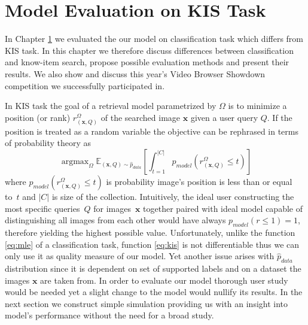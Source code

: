 \chapter{Model Evaluation on KIS Task}
In Chapter \ref{} we evaluated the our model on classification task which differs from KIS task. In this chapter we therefore discuss differences between classification and know-item search, propose possible evaluation methods and present their results. We also show and discuss this year's Video Browser Showdown competition we successfully participated in.

In KIS task the goal of a retrieval model parametrized by $\bm{\varOmega}$ is to minimize a position (or rank) $r_{(\bm{x},Q)}^{\bm{\varOmega}}$ of the searched image $\bm{x}$ given a user query $Q$. If the position is treated as a random variable the objective can be rephrased in terms of probability theory as
\begin{equation}
\mathop{\arg\max}_{\bm{\varOmega}}\mathbb{E}_{\left(\bm{x},Q\right)\sim \hat{p}_{data}}\left[
\int_{t=1}^{|C|}p_{model}\left(r_{(\bm{x},Q)}^{\bm{\varOmega}}\leq t\right)
\right]\label{eq:kis}
\end{equation}
where $p_{model}\left(r_{(\bm{x},Q)}^{\bm{\varOmega}}\leq t\right)$ is probability image's position is less than or equal to~$t$ and $|C|$ is size of the collection. Intuitively, the ideal user constructing the most specific queries~$Q$ for images~$\bm{x}$ together paired with ideal model capable of distinguishing all images from each other would have always ${p_{model}\left(r\leq 1\right)=1}$, therefore yielding the highest possible value. Unfortunately, unlike the function \ref{eq:mle} of a classification task, function \ref{eq:kis} is not differentiable thus we can only use it as quality measure of our model. Yet another issue arises with $\hat{p}_{data}$ distribution since it is dependent on set of supported labels and on a dataset the images $\bm{x}$ are taken from. In order to evaluate our model thorough user study would be needed yet a slight change to the model would nullify its results. In the next section we construct simple simulation providing us with an insight into model's performance without the need for a broad study.

